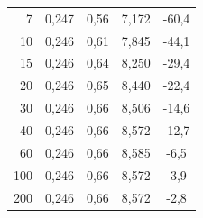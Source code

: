 \documentclass[a4paper, czech]{article}
\begin{document}
\begin{table}[H]
\begin{tabular}{rcccc}
        7          & 0,247                                                                       & 0,56                           & 7,172                                                        & -60,4                                                       \\
        10         & 0,246                                                                       & 0,61                           & 7,845                                                        & -44,1                                                       \\
        15         & 0,246                                                                       & 0,64                           & 8,250                                                        & -29,4                                                       \\
        20         & 0,246                                                                       & 0,65                           & 8,440                                                        & -22,4                                                       \\
        30         & 0,246                                                                       & 0,66                           & 8,506                                                        & -14,6                                                       \\
        40         & 0,246                                                                       & 0,66                           & 8,572                                                        & -12,7                                                       \\
        60         & 0,246                                                                       & 0,66                           & 8,585                                                        & -6,5                                                        \\
        100        & 0,246                                                                       & 0,66                           & 8,572                                                        & -3,9                                                        \\
        200        & 0,246                                                                       & 0,66                           & 8,572                                                        & -2,8                                                        \\

\end{tabular}
\end{table}
\end{document}
